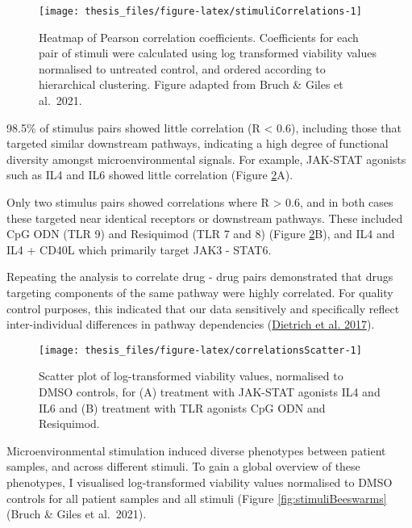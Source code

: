\documentclass[11pt, a4paper, twosided]{book}
\begin{document}
\begin{figure}

{\centering \texttt{[image: thesis\_files/figure-latex/stimuliCorrelations-1]} 

}

\caption{Heatmap of Pearson correlation coefficients. Coefficients for each pair of stimuli were calculated using log transformed viability values normalised to untreated control, and ordered according to hierarchical clustering. Figure adapted from Bruch \& Giles et al.~2021.}\label{fig:stimuliCorrelations}
\end{figure}
98.5\% of stimulus pairs showed little correlation (R \textless{} 0.6), including those that targeted similar downstream pathways, indicating a high degree of functional diversity amongst microenvironmental signals. For example, JAK-STAT agonists such as IL4 and IL6 showed little correlation (Figure \ref{fig:correlationsScatter}A).

Only two stimulus pairs showed correlations where R \textgreater{} 0.6, and in both cases these targeted near identical receptors or downstream pathways. These included CpG ODN (TLR 9) and Resiquimod (TLR 7 and 8) (Figure \ref{fig:correlationsScatter}B), and IL4 and IL4 + CD40L which primarily target JAK3 - STAT6.

Repeating the analysis to correlate drug - drug pairs demonstrated that drugs targeting components of the same pathway were highly correlated. For quality control purposes, this indicated that our data sensitively and specifically reflect inter-individual differences in pathway dependencies (\protect\hyperlink{ref-JCIpaper}{Dietrich et al. 2017}).


\begin{figure}

{\centering \texttt{[image: thesis\_files/figure-latex/correlationsScatter-1]} 

}

\caption{Scatter plot of log-transformed viability values, normalised to DMSO controls, for (A) treatment with JAK-STAT agonists IL4 and IL6 and (B) treatment with TLR agonists CpG ODN and Resiquimod.}\label{fig:correlationsScatter}
\end{figure}
Microenvironmental stimulation induced diverse phenotypes between patient samples, and across different stimuli. To gain a global overview of these phenotypes, I visualised log-transformed viability values normalised to DMSO controls for all patient samples and all stimuli (Figure \ref{fig:stimuliBeeswarms} (Bruch \& Giles et al.~2021).
\end{document}
